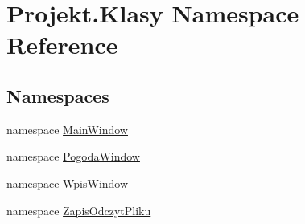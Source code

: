 \hypertarget{namespace_projekt_1_1_klasy}{}\section{Projekt.\+Klasy Namespace Reference}
\label{namespace_projekt_1_1_klasy}
\subsection*{Namespaces}
\begin{DoxyCompactItemize}
\item 
namespace \mbox{\hyperlink{namespace_projekt_1_1_klasy_1_1_main_window}{Main\+Window}}
\item 
namespace \mbox{\hyperlink{namespace_projekt_1_1_klasy_1_1_pogoda_window}{Pogoda\+Window}}
\item 
namespace \mbox{\hyperlink{namespace_projekt_1_1_klasy_1_1_wpis_window}{Wpis\+Window}}
\item 
namespace \mbox{\hyperlink{namespace_projekt_1_1_klasy_1_1_zapis_odczyt_pliku}{Zapis\+Odczyt\+Pliku}}
\end{DoxyCompactItemize}
